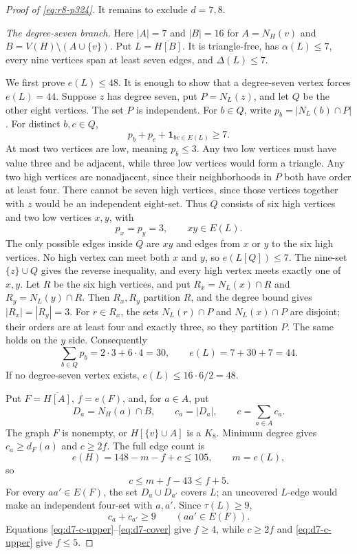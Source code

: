 \documentclass[11pt,reqno,a4paper]{amsart}
\theoremstyle{definition}
\theoremstyle{remark}
\newcommand{\comp}[1]{\overline{#1}}
\begin{document}
\begin{proof}[Proof of \eqref{eq:r8-p324}]
It remains to exclude $d=7,8$.

\medskip
\noindent\textit{The degree-seven branch.}
Here $|A|=7$ and $|B|=16$ for
$A=N_H(v)$ and $B=V(H)\setminus(A\cup\{v\})$. Put
$L=\comp{H[B]}$. It is triangle-free, has $\alpha(L)\leq7$, every
nine vertices span at least seven edges, and $\Delta(L)\leq7$.

We first prove $e(L)\leq48$. It is enough to show that a degree-seven
vertex forces $e(L)=44$. Suppose $z$ has degree seven, put
$P=N_L(z)$, and let $Q$ be the other eight vertices. The set $P$ is
independent. For $b\in Q$, write $p_b=|N_L(b)\cap P|$. For distinct
$b,c\in Q$,
\begin{equation}\label{eq:d7-pair}
 p_b+p_c+\mathbf1_{bc\in E(L)}\geq7.
\end{equation}
At most two vertices are low, meaning $p_b\leq3$. Any two low vertices
must have value three and be adjacent, while three low vertices would
form a triangle. Any two high vertices are nonadjacent, since their
neighborhoods in $P$ both have order at least four. There cannot be
seven high vertices, since those vertices together with $z$ would be an
independent eight-set. Thus $Q$ consists of six high vertices and two
low vertices $x,y$, with
\[
 p_x=p_y=3,
 \qquad xy\in E(L).
\]
The only possible edges inside $Q$ are $xy$ and edges from $x$ or $y$
to the six high vertices. No high vertex can meet both $x$ and $y$, so
$e(L[Q])\leq7$. The nine-set $\{z\}\cup Q$ gives the reverse
inequality, and every high vertex meets exactly one of $x,y$. Let $R$ be
the six high vertices, and put
$R_x=N_L(x)\cap R$ and $R_y=N_L(y)\cap R$. Then $R_x,R_y$ partition
$R$, and the degree bound gives $|R_x|=|R_y|=3$. For $r\in R_x$, the sets
$N_L(r)\cap P$ and $N_L(x)\cap P$ are disjoint; their orders are at
least four and exactly three, so they partition $P$. The same holds on
the $y$ side. Consequently
\[
 \sum_{b\in Q}p_b=2\cdot3+6\cdot4=30,
 \qquad e(L)=7+30+7=44.
\]
If no degree-seven vertex exists, $e(L)\leq16\cdot6/2=48$.

Put $F=\comp{H[A]}$, $f=e(F)$, and, for $a\in A$, put
\[
 D_a=N_H(a)\cap B,
 \qquad c_a=|D_a|,
 \qquad c=\sum_{a\in A}c_a.
\]
The graph $F$ is nonempty, or $H[\{v\}\cup A]$ is a $K_8$.
Minimum degree gives $c_a\geq d_F(a)$ and $c\geq2f$. The full edge
count is
\[
 e(H)=148-m-f+c\leq105,
 \qquad m=e(L),
\]
so
\begin{equation}\label{eq:d7-c-upper}
 c\leq m+f-43\leq f+5.
\end{equation}
For every $aa'\in E(F)$, the set $D_a\cup D_{a'}$ covers $L$; an
uncovered $L$-edge would make an independent four-set with $a,a'$.
Since $\tau(L)\geq9$,
\begin{equation}\label{eq:d7-cover}
 c_a+c_{a'}\geq9\qquad(aa'\in E(F)).
\end{equation}
Equations \eqref{eq:d7-c-upper}--\eqref{eq:d7-cover} give $f\geq4$,
while $c\geq2f$ and \eqref{eq:d7-c-upper} give $f\leq5$.


\end{proof}
\end{document}
